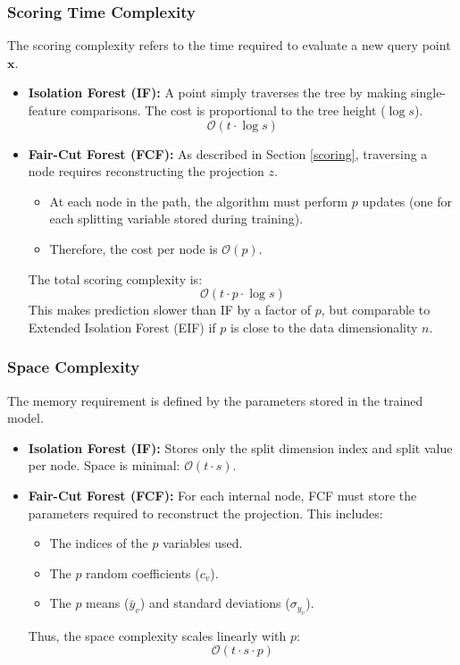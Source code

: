 \subsubsection{Scoring Time Complexity}
The scoring complexity refers to the time required to evaluate a new query point $\mathbf{x}$.

\begin{itemize}
    \item \textbf{Isolation Forest (IF):} A point simply traverses the tree by making single-feature comparisons. The cost is proportional to the tree height ($\log s$).
    $$ \mathcal{O}(t \cdot \log s) $$
    
    \item \textbf{Fair-Cut Forest (FCF):} As described in Section \ref{scoring}, traversing a node requires reconstructing the projection $z$.
    \begin{itemize}
        \item At each node in the path, the algorithm must perform $p$ updates (one for each splitting variable stored during training).
        \item Therefore, the cost per node is $\mathcal{O}(p)$.
    \end{itemize}
    The total scoring complexity is:
    $$ \mathcal{O}(t \cdot p \cdot \log s) $$
    This makes prediction slower than IF by a factor of $p$, but comparable to Extended Isolation Forest (EIF) if $p$ is close to the data dimensionality $n$.
\end{itemize}

\subsubsection{Space Complexity}
The memory requirement is defined by the parameters stored in the trained model.

\begin{itemize}
    \item \textbf{Isolation Forest (IF):} Stores only the split dimension index and split value per node. Space is minimal: $\mathcal{O}(t \cdot s)$.
    \item \textbf{Fair-Cut Forest (FCF):} For each internal node, FCF must store the parameters required to reconstruct the projection. This includes:
    \begin{itemize}
        \item The indices of the $p$ variables used.
        \item The $p$ random coefficients ($c_v$).
        \item The $p$ means ($\bar{y}_v$) and standard deviations ($\sigma_{y_v}$).
    \end{itemize}
    Thus, the space complexity scales linearly with $p$:
    $$ \mathcal{O}(t \cdot s \cdot p) $$
\end{itemize}